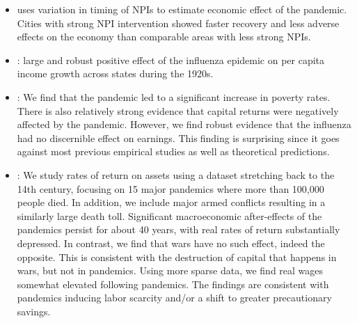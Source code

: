 \documentclass[12pt,a4paper]{article}
\begin{document}
\begin{itemize}
	\item \cite{correiaPandemicsDepressEconomy2020} uses variation in timing of NPIs to estimate economic effect of the pandemic. Cities with strong NPI intervention showed faster recovery and less adverse effects on the economy than comparable areas with less strong NPIs.
	\item \cite{brainerdEconomicEffects19182003}: large and robust positive effect of the influenza epidemic on per capita income growth across states during the 1920s. 
	\item \cite{karlssonImpact1918Spanish2014}: We find that the pandemic led to a significant increase in poverty rates.
	There is also relatively strong evidence that capital returns were negatively affected by the pandemic.
	 However, we find robust evidence that the influenza had no discernible effect on earnings.
	 Thisfinding is surprising since it goes against most previous empirical studies as well as theoretical predictions.
	
	\item \cite{jordaLongerrunEconomicConsequences2020}: We study rates of return on assets
	using a dataset stretching back to the 14th century, focusing on 15 major pandemics
	where more than 100,000 people died. In addition, we include major armed conflicts
	resulting in a similarly large death toll. Significant macroeconomic after-effects of the
	pandemics persist for about 40 years, with real rates of return substantially depressed.
	In contrast, we find that wars have no such effect, indeed the opposite. This is consistent
	with the destruction of capital that happens in wars, but not in pandemics. Using
	more sparse data, we find real wages somewhat elevated following pandemics. The
	findings are consistent with pandemics inducing labor scarcity and/or a shift to greater
	precautionary savings.
\end{itemize}
\end{document}
